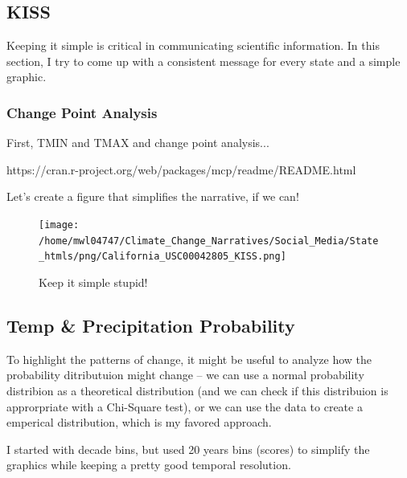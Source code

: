 \documentclass{article}
\begin{document}
\begin{itemize}
\subsection{KISS}

Keeping it simple is critical in communicating scientific information. In this section, I try to come up with a consistent message for every state and a simple graphic. 

\subsubsection{Change Point Analysis}
First, TMIN and TMAX and change point analysis...

https://cran.r-project.org/web/packages/mcp/readme/README.html



Let's create a figure that simplifies the narrative, if we can!

\begin{knitrout}
\color{fgcolor}\begin{kframe}


{\ttfamily\noindent\bfseries\color{errorcolor}{\#\# Error in seq(min(GSOM\$Year), max(GSOM\$Year), by = 2): object 'GSOM' not found}}\end{kframe}
\end{knitrout}

\begin{figure}
\texttt{[image: /home/mwl04747/Climate\_Change\_Narratives/Social\_Media/State\_htmls/png/California\_USC00042805\_KISS.png]}
\caption{Keep it simple stupid!}
\label{fig:GSOM-KISS}
\end{figure}

\subsection{Temp \& Precipitation Probability}

To highlight the patterns of change, it might be useful to analyze how the probability ditributuion might change -- we can use a normal probability distribion as a theoretical distribution (and we can check if this distribuion is approrpriate with a Chi-Square test), or we can use the data to create a emperical distribution, which is my favored approach. 

I started with decade bins, but used 20 years bins (scores) to simplify the graphics while keeping a pretty good temporal resolution.


\end{itemize}
\end{document}

